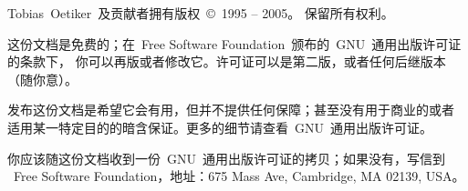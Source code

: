 \pagebreak
\begin{small}
   Tobias\ Oetiker~及贡献者拥有版权~\copyright\ 1995 -- 2005。
   保留所有权利。

   这份文档是免费的；在~Free Software Foundation~颁布的~GNU~通用出版许可证的条款下，
   你可以再版或者修改它。许可证可以是第二版，或者任何后继版本（随你意）。

   发布这份文档是希望它会有用，但并不提供任何保障；甚至没有用于商业的或者
   适用某一特定目的的暗含保证。更多的细节请查看~GNU~通用出版许可证。

   你应该随这份文档收到一份~GNU~通用出版许可证的拷贝；如果没有，写信到
   ~Free Software Foundation，地址：675 Mass Ave, Cambridge, MA 02139, USA。

\end{small}


\endinput

%

